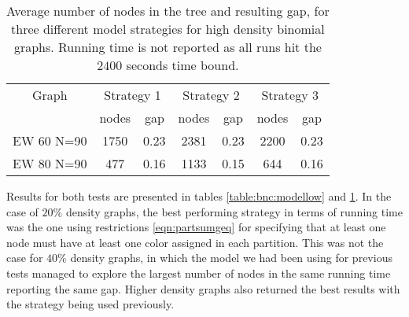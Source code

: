 \begin{table}[h]
\centering

\begin{tabular}{|c|cc|cc|cc|}
\hline
\multicolumn{1}{|c|}{Graph} & \multicolumn{2}{|c|}{Strategy 1} & \multicolumn{2}{|c|}{Strategy 2} & \multicolumn{2}{|c|}{Strategy 3}
\\
 & nodes & gap & nodes & gap & nodes & gap
\\
\hline
EW 60 N=90 & 1750& 0.23 & 2381 & 0.23 & 2200 & 0.23
\\
EW 80 N=90 & 477 & 0.16 & 1133 & 0.15 & 644 &0.16
\\
\hline 
 \end{tabular}
 
 \caption{Average number of nodes in the tree and resulting gap, for three different model strategies for high density binomial graphs. Running time is not reported as all runs hit the $2400$ seconds time bound.}
\label{table:bnc:modelhigh}

\end{table}

Results for both tests are presented in tables \ref{table:bnc:modellow} and \ref{table:bnc:modelhigh}. In the case of $20\%$ density graphs, the best performing strategy in terms of running time was the one using restrictions \ref{eqn:partsumgeq} for specifying that at least one node must have at least one color assigned in each partition. This was not the case for $40\%$ density graphs, in which the model we had been using for previous tests managed to explore the largest number of nodes in the same running time reporting the same gap. Higher density graphs also returned the best results with the strategy being used previously.